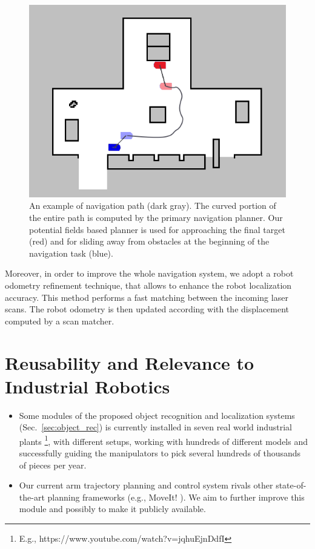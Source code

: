 \documentclass{llncs}
\begin{document}
\begin{figure}[h!]
\begin{center}
\begin{minipage}[b]{\linewidth}
	\begin{center}\includegraphics[angle=0,width=0.8\linewidth]{images/navigation.png}\end{center}
\end{minipage}\hfill
\end{center}
\caption{An example of navigation path (dark gray). The curved portion of the entire path is computed by the primary navigation planner. Our potential fields based planner is used for approaching the final target (red) and for sliding away from obstacles at the beginning of the navigation task (blue).}\label{fig:intro_navigation}
\end{figure}

Moreover, in order to improve the whole navigation system, we adopt a robot odometry refinement technique, that allows to enhance the robot localization accuracy. This method performs a fast matching between the incoming laser scans. The robot odometry is then updated according with the displacement computed by a scan matcher.\\

\section{Reusability and Relevance to Industrial Robotics}

\begin{itemize}
 \item Some modules of the proposed object recognition and localization systems (Sec.~\ref{sec:object_rec}) is currently installed in seven real world industrial plants \footnote{E.g., https://www.youtube.com/watch?v=jqhuEjnDdfI}, with different setups, working with hundreds of different models and successfully guiding the manipulators to pick several hundreds of thousands of pieces per year. 
 \item Our current arm trajectory planning and control system rivals other state-of-the-art planning frameworks (e.g., MoveIt! \cite{moveitweb}). We aim to further improve this module and possibly to make it publicly available.
\end{itemize}


 

\end{document}
